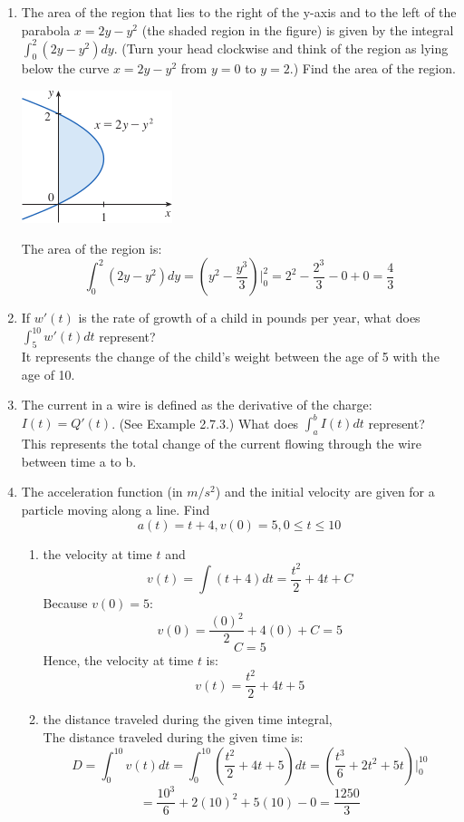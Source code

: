 \documentclass[12pt]{article}
\begin{document}
\begin{enumerate}
\newpage
\setcounter{enumi}{48}
    \item The area of the region that lies to the right of the y-axis and to the left of the parabola $x = 2y - y^2$ (the shaded region in the figure) is given by the integral $\int_{0}^{2} (2y - y^2)dy$. (Turn your head clockwise and think of the region as lying below the curve $x=2y-y^2$ from $y=0$ to $y=2$.) Find the area of the region.      
    \begin{center}
        \includegraphics{img/img-2.png}
    \end{center}
    The area of the region is:
    \[\int_{0}^{2} (2y - y^2)dy = (y^2 - \frac{y^3}{3})|_{0}^{2} = 2^2 - \frac{2^3}{3} - 0 + 0 = \frac{4}{3}\]
\setcounter{enumi}{50}
    \item If $w'(t)$ is the rate of growth of a child in pounds per year, what does $\int_{5}^{10} w'(t)dt$ represent?\\
    It represents the change of the child's weight between the age of 5 with the age of 10.
    \item The current in a wire is defined as the derivative of the charge: $I(t) = Q'(t)$. (See Example 2.7.3.) What does $\int_{a}^{b} I(t)dt$ represent?\\
    This represents the total change of the current flowing through the wire between time a to b.
\setcounter{enumi}{62}
    \item The acceleration function (in $m/s^2$) and the initial velocity are given for a particle moving along a line. Find
    \[a(t) = t + 4, v(0) = 5, 0 \leq t \leq 10\]
    \begin{enumerate}
        \item the velocity at time $t$ and
        \[v(t) = \int (t + 4) dt = \frac{t^2}{2} + 4t + C\]
        Because $v(0) = 5$:
        \[v(0) = \frac{(0)^2}{2} + 4(0) + C = 5\]
        \[C = 5\]
        Hence, the velocity at time $t$ is:
        \[v(t) = \frac{t^2}{2} + 4t + 5\]
        \item the distance traveled during the given time integral,\\
        The distance traveled during the given time is:
        \[D = \int_{0}^{10} v(t)dt = \int_{0}^{10} (\frac{t^2}{2} + 4t + 5) dt = (\frac{t^3}{6} + 2t^2 + 5t)|_{0}^{10}\]
        \[ = \frac{10^3}{6} + 2(10)^2 + 5(10) - 0 = \frac{1250}{3}\]
    \end{enumerate}
\end{enumerate}
\end{document}
